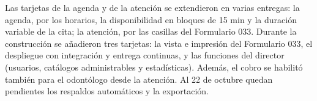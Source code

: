 Las tarjetas de la agenda y de la atención se extendieron en varias entregas: la agenda, por los horarios, la disponibilidad en bloques de 15 min y la duración variable de la cita; la atención, por las casillas del Formulario 033. Durante la construcción se añadieron tres tarjetas: la vista e impresión del Formulario 033, el despliegue con integración y entrega continuas, y las funciones del director (usuarios, catálogos administrables y estadísticas). Además, el cobro se habilitó también para el odontólogo desde la atención. Al 22 de octubre quedan pendientes los respaldos automáticos y la exportación.
